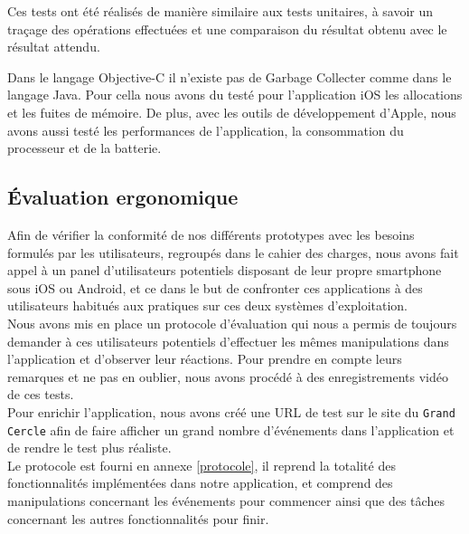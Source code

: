 \documentclass[a4paper, 11pt]{article}
\begin{document}
Ces tests ont été réalisés de manière similaire aux tests unitaires, à savoir un traçage des opérations effectuées et une comparaison du résultat obtenu avec le résultat attendu.

Dans le langage Objective-C il n'existe pas de Garbage Collecter comme dans le langage Java. Pour cella nous avons du testé pour l'application iOS les allocations et les fuites de mémoire. De plus, avec les outils de développement d'Apple, nous avons aussi testé les performances de l'application, la consommation du processeur et de la batterie.

\subsection{Évaluation ergonomique}
Afin de vérifier la conformité de nos différents prototypes avec les besoins formulés par les utilisateurs, regroupés dans le cahier des charges, nous avons fait appel à un panel d'utilisateurs potentiels disposant de leur propre smartphone sous iOS ou Android, et ce dans le but de confronter ces applications à des utilisateurs habitués aux pratiques sur ces deux systèmes d'exploitation.\\

Nous avons mis en place un protocole d'évaluation qui nous a permis de toujours demander à ces utilisateurs potentiels d'effectuer les mêmes manipulations dans l'application et d'observer leur réactions. Pour prendre en compte leurs remarques et ne pas en oublier, nous avons procédé à des enregistrements vidéo de ces tests.\\
Pour enrichir l'application, nous avons créé une URL de test sur le site du \texttt{Grand Cercle} afin de faire afficher un grand nombre d'événements dans l'application et de rendre le test plus réaliste.\\

Le protocole est fourni en annexe \ref{protocole}, il reprend la totalité des fonctionnalités implémentées dans notre application, et comprend des manipulations concernant les événements pour commencer ainsi que des tâches concernant les autres fonctionnalités pour finir.


\appendix
\addappheadtotoc

\newpage
\end{document}
